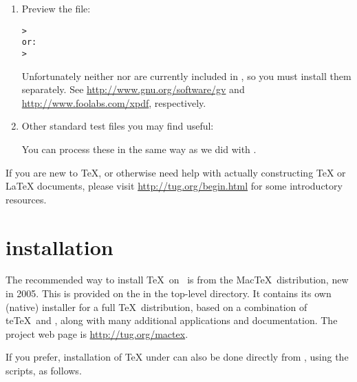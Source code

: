 \documentclass{article}
\begin{document}
\begin{enumerate}
\item Preview the  file:
\begin{alltt}
> 
\textrm{or:}
> 
\end{alltt}
Unfortunately neither  nor  are currently
included in \TL{}, so you must install them separately.  See
\url{http://www.gnu.org/software/gv} and
\url{http://www.foolabs.com/xpdf}, respectively.

\item Other standard test files you may find useful:

You can process these in the same way as we did with
.

\end{enumerate}

If you are new to \TeX{}, or otherwise need help with actually
constructing \TeX{} or \LaTeX{} documents, please visit
\url{http://tug.org/begin.html} for some introductory resources.


\section{\MacOSX{} installation}
\label{sec:mac-install}

The recommended way to install \TeX\ on \MacOSX\ is from the Mac\TeX\
distribution, new in 2005.  This is provided on the 
\DVD{} in the top-level \dirname{mactex/} directory.  It contains its
own (native) installer for a full \TeX\ distribution, based on a
combination of te\TeX\ and \TL, along with many additional applications
and documentation.  The project web page is \url{http://tug.org/mactex}.

If you prefer, installation of \TeX{} under \MacOSX{} can also be done
directly from \TL, using the \filename{install*} scripts, as follows.
\end{document}
